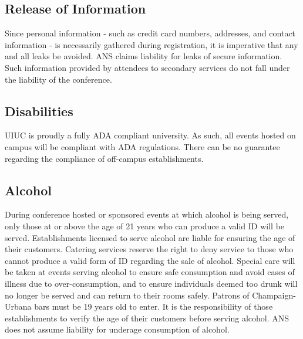 \subsection{Release of Information}
Since personal information - such as credit card numbers, addresses, and contact information - is necessarily gathered during registration, it is imperative that any and all leaks be avoided. ANS claims liability for leaks of secure information. Such information provided by attendees to secondary services do not fall under the liability of the conference.

\subsection{Disabilities}
UIUC is proudly a fully ADA compliant university. As such, all events hosted on campus will be compliant with ADA regulations. There can be no guarantee regarding the compliance of off-campus establishments.

\subsection{Alcohol}
During conference hosted or sponsored events at which alcohol is being served, only those at or above the age of 21 years who can produce a valid ID will be served. Establishments licensed to serve alcohol are liable for ensuring the age of their customers. Catering services reserve the right to deny service to those who cannot produce a valid form of ID regarding the sale of alcohol. Special care will be taken at events serving alcohol to ensure safe consumption and avoid cases of illness due to over-consumption, and to ensure individuals deemed too drunk will no longer be served and can return to their rooms safely.
Patrons of Champaign-Urbana bars must be 19 years old to enter. It is the responsibility of those establishments to verify the age of their customers before serving alcohol. ANS does not assume liability for underage consumption of alcohol.

